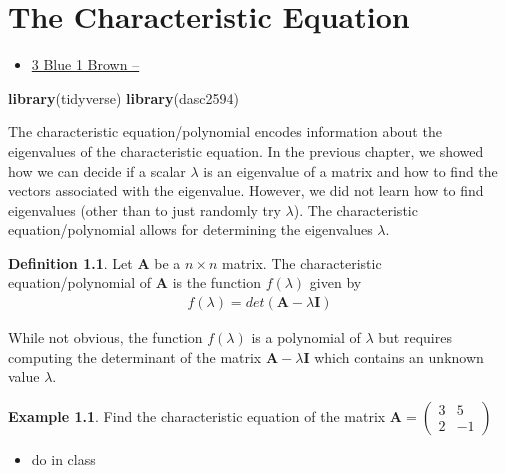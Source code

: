 \documentclass[
]{book}
\newenvironment{Shaded}{\begin{snugshade}}{\end{snugshade}}
\newcommand{\KeywordTok}[1]{\textcolor[rgb]{0.13,0.29,0.53}{\textbf{#1}}}
\newcommand{\NormalTok}[1]{#1}
\providecommand{\tightlist}{%
  \setlength{\itemsep}{0pt}\setlength{\parskip}{0pt}}
\theoremstyle{definition}
\newtheorem{definition}{Definition}[chapter]
\theoremstyle{definition}
\newtheorem{example}{Example}[chapter]
\theoremstyle{definition}
\theoremstyle{definition}
\theoremstyle{remark}
\begin{document}
\hypertarget{the-characteristic-equation}{%
\chapter{The Characteristic Equation}\label{the-characteristic-equation}}

\begin{itemize}
\tightlist
\item
  \href{https://www.3blue1brown.com/lessons/quick-eigen}{3 Blue 1 Brown --}
\end{itemize}

\begin{Shaded}
\begin{Highlighting}[]
\KeywordTok{library}\NormalTok{(tidyverse)}
\KeywordTok{library}\NormalTok{(dasc2594)}
\end{Highlighting}
\end{Shaded}

The characteristic equation/polynomial encodes information about the eigenvalues of the characteristic equation. In the previous chapter, we showed how we can decide if a scalar \(\lambda\) is an eigenvalue of a matrix and how to find the vectors associated with the eigenvalue. However, we did not learn how to find eigenvalues (other than to just randomly try \(\lambda\)). The characteristic equation/polynomial allows for determining the eigenvalues \(\lambda\).

\begin{definition}
Let \(\mathbf{A}\) be a \(n \times n\) matrix. The characteristic equation/polynomial of \(\mathbf{A}\) is the function \(f(\lambda)\) given by
\[
\begin{aligned}
f(\lambda) = det(\mathbf{A} - \lambda \mathbf{I})
\end{aligned}
\]
\end{definition}

While not obvious, the function \(f(\lambda)\) is a polynomial of \(\lambda\) but requires computing the determinant of the matrix \(\mathbf{A} - \lambda \mathbf{I}\) which contains an unknown value \(\lambda\).

\begin{example}

Find the characteristic equation of the matrix \(\mathbf{A} = \begin{pmatrix} 3 & 5 \\ 2 & -1 \end{pmatrix}\)

\begin{itemize}
\tightlist
\item
  do in class
\end{itemize}

\end{example}
\end{document}
